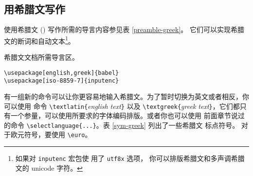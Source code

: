 \subsection{用希腊文写作}
使用希腊文 () 写作所需的导言内容参见表 \ref{preamble-greek}。
它们可以实现希腊文的断词和自动文本\footnote{如果对 \texttt{inputenc} 宏包使
用了 \texttt{utf8x} 选项，
你可以排版希腊文和多声调希腊文的 unicode 字符。}。

\begin{table}[hbtp]
\caption{希腊文文档所需导言区。} \label{preamble-greek}
\begin{lined}{7cm}
\begin{verbatim}
\usepackage[english,greek]{babel}
\usepackage[iso-8859-7]{inputenc}
\end{verbatim}
\smallskip
\end{lined}
\end{table}

有一组新的命令可以让你更容易地输入希腊文。为了暂时切换为英文或者相反，你可以使用
命令 \verb|\textlatin{|\emph{english
text}\verb|}| 以及 \verb|\textgreek{|\emph{greek
text}\verb|}|，它们都只有一个参量，可以使用所要求的字体编码排版。或者你也可以使用
前面章节说过的命令 \verb|\selectlanguage{...}|。表 \ref{sym-greek} 列出了一些希腊文
标点符号。 对于欧元符号，要使用 \verb|\euro|。

